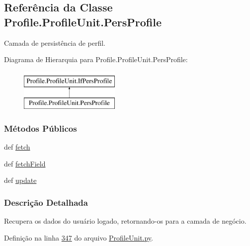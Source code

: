 \hypertarget{classProfile_1_1ProfileUnit_1_1PersProfile}{\subsection{Referência da Classe Profile.\-Profile\-Unit.\-Pers\-Profile}
\label{classProfile_1_1ProfileUnit_1_1PersProfile}
}


Camada de persistência de perfil.  


Diagrama de Hierarquia para Profile.\-Profile\-Unit.\-Pers\-Profile\-:\begin{figure}[H]
\begin{center}
\leavevmode
\includegraphics[height=2.000000cm]{d7/dec/classProfile_1_1ProfileUnit_1_1PersProfile}
\end{center}
\end{figure}
\subsubsection*{Métodos Públicos}
\begin{DoxyCompactItemize}
\item 
def \hyperlink{classProfile_1_1ProfileUnit_1_1PersProfile_aca301abc09bc12a7cf0a61437f941a8a}{fetch}
\item 
def \hyperlink{classProfile_1_1ProfileUnit_1_1PersProfile_a68ab67bed74c46b72216e256af8f6711}{fetch\-Field}
\item 
def \hyperlink{classProfile_1_1ProfileUnit_1_1PersProfile_af1e4b3cf0eee0a14b5113210503ff665}{update}
\end{DoxyCompactItemize}


\subsubsection{Descrição Detalhada}
Recupera os dados do usuário logado, retornando-\/os para a camada de negócio. 

Definição na linha \hyperlink{ProfileUnit_8py_source_l00347}{347} do arquivo \hyperlink{ProfileUnit_8py_source}{Profile\-Unit.\-py}.



